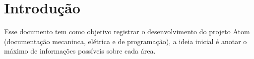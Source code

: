 \chapter{Introdução}
Esse documento tem como objetivo registrar o desenvolvimento do projeto Atom (documentação mecaninca, elétrica e de programação), a ideia inicial é anotar o máximo de informações possíveis sobre cada área.
